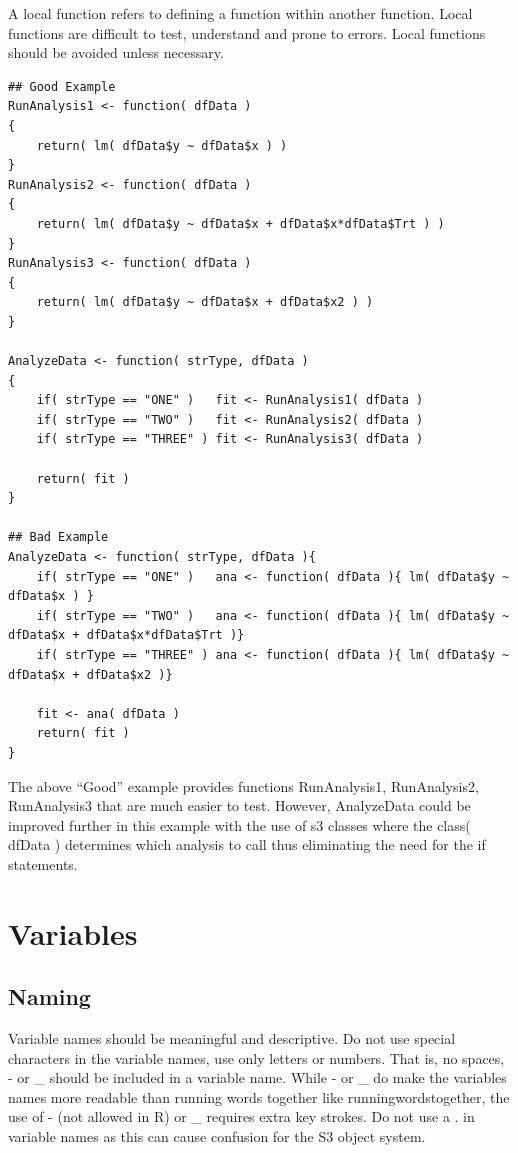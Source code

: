 \documentclass[
]{book}
\begin{document}
A local function refers to defining a function within another function. Local functions are difficult to test, understand and prone to errors. Local functions should be avoided unless necessary.

\begin{verbatim}
## Good Example 
RunAnalysis1 <- function( dfData )
{
    return( lm( dfData$y ~ dfData$x ) )
}
RunAnalysis2 <- function( dfData )
{
    return( lm( dfData$y ~ dfData$x + dfData$x*dfData$Trt ) )
}
RunAnalysis3 <- function( dfData )
{
    return( lm( dfData$y ~ dfData$x + dfData$x2 ) )
}

AnalyzeData <- function( strType, dfData )
{
    if( strType == "ONE" )   fit <- RunAnalysis1( dfData )
    if( strType == "TWO" )   fit <- RunAnalysis2( dfData )
    if( strType == "THREE" ) fit <- RunAnalysis3( dfData )
    
    return( fit )
}

## Bad Example
AnalyzeData <- function( strType, dfData ){
    if( strType == "ONE" )   ana <- function( dfData ){ lm( dfData$y ~ dfData$x ) }
    if( strType == "TWO" )   ana <- function( dfData ){ lm( dfData$y ~ dfData$x + dfData$x*dfData$Trt )}
    if( strType == "THREE" ) ana <- function( dfData ){ lm( dfData$y ~ dfData$x + dfData$x2 )}
    
    fit <- ana( dfData )
    return( fit )
}
\end{verbatim}

The above ``Good'' example provides functions RunAnalysis1, RunAnalysis2, RunAnalysis3 that are much easier to test. However, AnalyzeData could be improved further in this example with the use of s3 classes where the class( dfData ) determines which analysis to call thus eliminating the need for the if statements.

\hypertarget{variables}{%
\chapter{Variables}\label{variables}}

\hypertarget{naming-1}{%
\section{Naming}\label{naming-1}}

Variable names should be meaningful and descriptive. Do not use special characters in the variable names, use only letters or numbers. That is, no spaces, - or \_ should be included in a variable name. While - or \_ do make the variables names more readable than running words together like runningwordstogether, the use of - (not allowed in R) or \_ requires extra key strokes. Do not use a . in variable names as this can cause confusion for the S3 object system.
\end{document}
